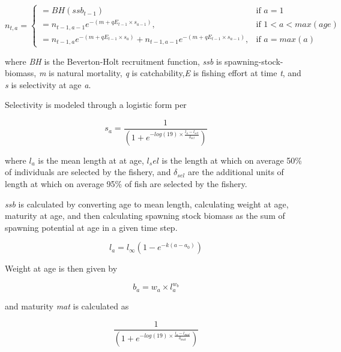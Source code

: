 \documentclass[]{article}
\begin{document}
\begin{equation}
n_{t,a}=\begin{cases}
      = BH(ssb_{t-1}) & \text{if $a = 1$}\\
     = n_{t-1,a-1}e^{-(m + qE_{t-1}{\times}s_{a-1})}, & \text{if $1< a < max(age)$}\\
     =  n_{t-1,a}e^{-(m + qE_{t-1}{\times}s_a)} + n_{t-1,a-1}e^{-(m + qE_{t-1}{\times}s_{a-1})}, & \text{if $a = max(a)$}
  \end{cases}
  \label{eq:pop}
\end{equation}

where \emph{BH} is the Beverton-Holt recruitment function, \emph{ssb} is spawning-stock-biomass, \emph{m} is natural mortality, \emph{q} is catchability,\emph{E} is fishing effort at time \emph{t}, and \emph{s} is selectivity at age \emph{a}.

Selectivity is modeled through a logistic form per

\begin{equation}
s_a=\frac{1}{(1 + e^{-log(19)\times\frac{l_a - l_{sel}}{\delta_{sel}}})}
  \label{eq:sel}
\end{equation}

where \(l_a\) is the mean length at at age, \(l_sel\) is the length at which on average 50\% of individuals are selected by the fishery, and \(\delta_{sel}\) are the additional units of length at which on average 95\% of fish are selected by the fishery.

\emph{ssb} is calculated by converting age to mean length, calculating weight at age, maturity at age, and then calculating spawning stock biomass as the sum of spawning potential at age in a given time step.

\begin{equation}
  l_{a} = l_{\infty}\left(1 - e^{-k(a - a_0)}\right)
  \label{eq:len}
\end{equation}

Weight at age is then given by

\begin{equation}
  b_{a} = w_a \times l_{a}^{w_b}
  \label{eq:weight}
\end{equation}

and maturity \emph{mat} is calculated as

\begin{equation}
  \frac{1}{(1 + e^{-log(19)\times\frac{l_a - l_{mat}}{\delta_{mat}}})}
  \label{eq:mat}
\end{equation}
\end{document}
